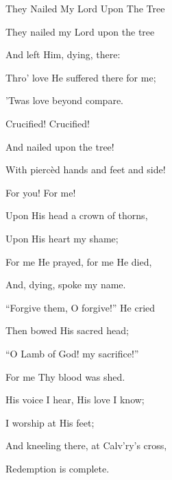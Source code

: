\documentclass[12pt]{book}
\begin{document}
\begin{song}{They Nailed My Lord Upon The Tree}{}
  {\SBPubDom}
  {}
  {}
  {}

  \begin{SBVerse}
    They nailed my Lord upon the tree

    And left Him, dying, there:

    Thro' love He suffered there for me;

    'Twas love beyond compare.
  \end{SBVerse}

  \begin{SBOpGroup}
    Crucified! Crucified!

    And nailed upon the tree!

    With pierc\`ed hands and feet and side!

    For you! For me!
  \end{SBOpGroup}

  \begin{SBVerse}
    Upon His head a crown of thorns,

    Upon His heart my shame;

    For me He prayed, for me He died,

    And, dying, spoke my name.
  \end{SBVerse}

  \begin{SBVerse}
    ``Forgive them, O forgive!'' He cried

    Then bowed His sacred head;

    ``O Lamb of God! my sacrifice!''

    For me Thy blood was shed.
  \end{SBVerse}

  \begin{SBVerse}
    His voice I hear, His love I know;

    I worship at His feet;

    And kneeling there, at Calv'ry's cross,

    Redemption is complete.
  \end{SBVerse}
\end{song}
\end{document}
